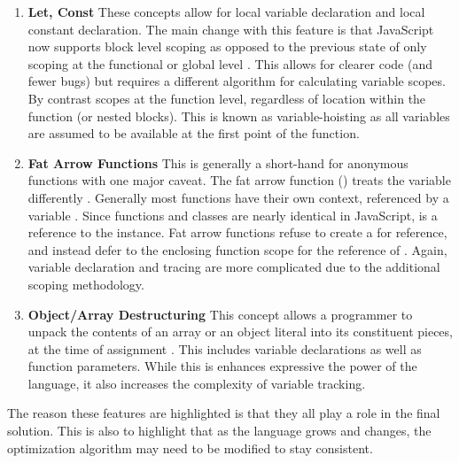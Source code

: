   \begin{enumerate}
    \item \textbf{Let, Const} These concepts allow for local variable declaration and local constant declaration.  The main change with this feature is that JavaScript now supports block level scoping as opposed to the previous state of only scoping at the functional or global level \cite{let16} \cite{const16}.  This allows for clearer code (and fewer bugs) but requires a different algorithm for calculating variable scopes.  By contrast  scopes at the function level, regardless of location within the function (or nested blocks).  This is known as variable-hoisting as all variables are assumed to be available at the first point of the function.
    \item \textbf{Fat Arrow Functions} This is generally a short-hand for anonymous functions with one major caveat.  The fat arrow function () treats the  variable differently \cite{arrowfn16}.  Generally most functions have their own context, referenced by a variable .  Since functions and classes are nearly identical in JavaScript,  is a reference to the instance.  Fat arrow functions refuse to create a  for reference, and instead defer to the enclosing function scope for the reference of . Again, variable declaration and tracing are more complicated due to the additional scoping methodology.
    \item \textbf{Object/Array Destructuring}  This concept allows a programmer to unpack the contents of an array or an object literal into its constituent pieces, at the time of assignment \cite{destructuring16}.  This includes variable declarations as well as function parameters.  While this is enhances expressive the power of the language, it also increases the complexity of variable tracking.  
  \end{enumerate}

The reason these features are highlighted is that they all play a role in the final solution.  This is also to highlight that as the language grows and changes, the optimization algorithm may need to be modified to stay consistent. 